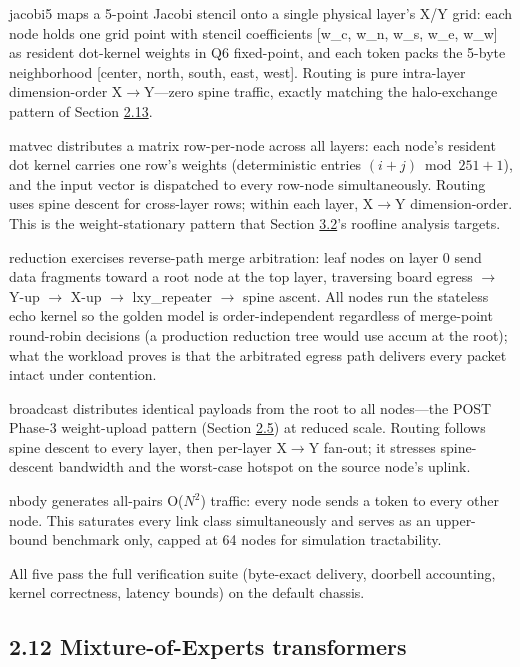 \documentclass[10pt,twocolumn]{article}
\begin{document}
jacobi5 maps a 5-point Jacobi stencil onto a single physical layer's X/Y grid: each node holds one grid point with stencil coefficients [w\_c, w\_n, w\_s, w\_e, w\_w] as resident dot-kernel weights in Q6 fixed-point, and each token packs the 5-byte neighborhood [center, north, south, east, west]. Routing is pure intra-layer dimension-order X$\rightarrow$Y---zero spine traffic, exactly matching the halo-exchange pattern of Section \hyperref[sec:2.13]{2.13}.

matvec distributes a matrix row-per-node across all layers: each node's resident dot kernel carries one row's weights (deterministic entries $(i+j) \bmod 251 + 1$), and the input vector is dispatched to every row-node simultaneously. Routing uses spine descent for cross-layer rows; within each layer, X$\rightarrow$Y dimension-order. This is the weight-stationary pattern that Section \hyperref[sec:3.2]{3.2}'s roofline analysis targets.

reduction exercises reverse-path merge arbitration: leaf nodes on layer 0 send data fragments toward a root node at the top layer, traversing board egress $\rightarrow$ Y-up $\rightarrow$ X-up $\rightarrow$ lxy\_repeater $\rightarrow$ spine ascent. All nodes run the stateless echo kernel so the golden model is order-independent regardless of merge-point round-robin decisions (a production reduction tree would use accum at the root); what the workload proves is that the arbitrated egress path delivers every packet intact under contention.

broadcast distributes identical payloads from the root to all nodes---the POST Phase-3 weight-upload pattern (Section \hyperref[sec:2.5]{2.5}) at reduced scale. Routing follows spine descent to every layer, then per-layer X$\rightarrow$Y fan-out; it stresses spine-descent bandwidth and the worst-case hotspot on the source node's uplink.

nbody generates all-pairs O($N^2$) traffic: every node sends a token to every other node. This saturates every link class simultaneously and serves as an upper-bound benchmark only, capped at 64 nodes for simulation tractability.

All five pass the full verification suite (byte-exact delivery, doorbell accounting, kernel correctness, latency bounds) on the default chassis.

\subsection*{2.12 Mixture-of-Experts transformers}\label{sec:2.12}
\end{document}
